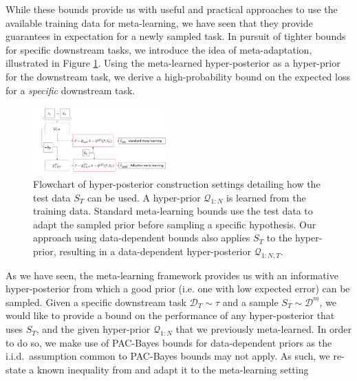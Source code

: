 \documentclass{article} %
\theoremstyle{definition}
\begin{document}
While these bounds provide us with useful and practical approaches to use the available training data for meta-learning, we have seen that they provide guarantees in expectation for a newly sampled task. In pursuit of tighter bounds for specific downstream tasks, we introduce the idea of meta-adaptation, illustrated in Figure \ref{fig:data_dependant_bound}. Using the meta-learned hyper-posterior as a hyper-prior for the downstream task, we derive a high-probability bound on the expected loss for a \emph{specific} downstream task. 

\begin{figure}[t]
	\centering
	\includegraphics[width=0.47\textwidth]{data_dependant_adaptation.PNG}
	\caption{Flowchart of hyper-posterior construction settings detailing how the test data $S_T$ can be used. A hyper-prior $\mathcal{Q}_{1:N}$ is learned from the training data. Standard meta-learning bounds use the test data to adapt the sampled prior before sampling a specific hypothesis. Our approach using data-dependent bounds also applies $S_T$ to the hyper-prior, resulting in a data-dependent hyper-posterior $\mathcal{Q}_{1:N, T}$. }
	\label{fig:data_dependant_bound}
\end{figure}

As we have seen, the meta-learning framework provides us with an informative hyper-posterior from which a good prior (i.e.\! one with low expected error) can be sampled. Given a specific downstream task $\mathcal{D}_T\sim \tau$ and a sample $S_T\sim \mathcal{D}^m$, we would like to provide a bound on the performance of any hyper-posterior that uses $S_T$, and the given hyper-prior $\mathcal{Q}_{1:N}$ that we previously meta-learned. In order to do so, we make use of PAC-Bayes bounds for data-dependent priors as the i.i.d.\ assumption common to PAC-Bayes bounds may not apply. As such, we re-state a known inequality from \citet{Rivasplata2020} and adapt it to the meta-learning setting
\end{document}
